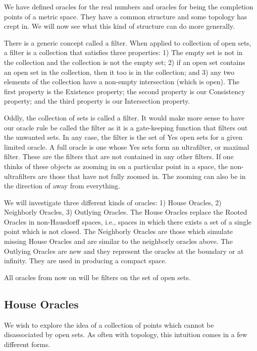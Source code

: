 \documentclass[12pt]{article}
\begin{document}
We have defined oracles for the real numbers and oracles for being the completion points of a metric space. They have a common structure and some topology has crept in. We will now see what this kind of structure can do more generally. 

There is a generic concept called a filter. When applied to collection of open sets, a filter is a collection that satisfies three properties: 1) The empty set is not in the collection and the collection is not the empty set; 2) if an open set contains an open set in the collection, then it too is in the collection; and 3) any two elements of the collection have a non-empty intersection (which is open). The first property is the Existence property; the second property is our Consistency property; and the third property is our Intersection property. 

Oddly, the collection of sets is called a filter. It would make more sense to have our oracle rule be called the filter as it is a gate-keeping function that filters out the unwanted sets. In any case, the filter is the set of Yes open sets for a given limited oracle. A full oracle is one whose Yes sets form an ultrafilter, or maximal filter. These are the filters that are not contained in any other filters. If one thinks of these objects as zooming in on a particular point in a space, the non-ultrafilters are those that have not fully zoomed in. The zooming can also be in the direction of away from everything. 

We will investigate three different kinds of oracles: 1) House Oracles, 2) Neighborly Oracles, 3) Outlying Oracles. The House Oracles replace the Rooted Oracles in non-Hausdorff spaces, i.e., spaces in which there exists a set of a single point which is not closed. The Neighborly Oracles are those which simulate missing House Oracles and are similar to the neighborly oracles above. The Outlying Oracles are new and they represent the oracles at the boundary or at infinity. They are used in producing a compact space. 

All oracles from now on will be filters on the set of open sets.

\subsection{House Oracles}

We wish to explore the idea of a  collection of points which cannot be disassociated by open sets. As often with topology, this intuition comes in a few different forms. 
\end{document}
